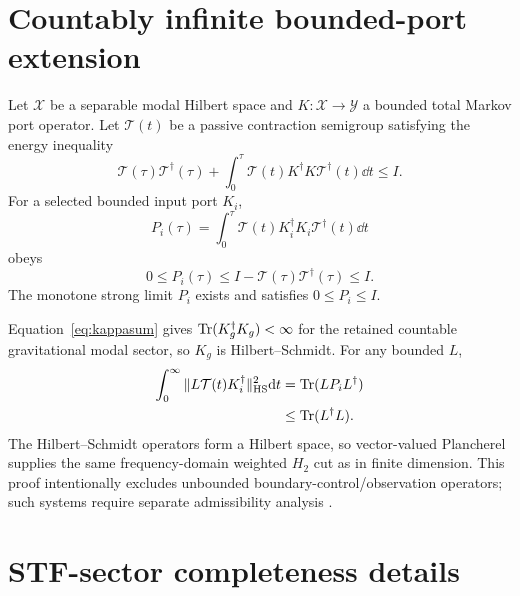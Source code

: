 \appendix

\section{Countably infinite bounded-port extension}
\label{app:infinite}

Let $\mathcal X$ be a separable modal Hilbert space and $K:\mathcal X\rightarrow\mathcal Y$ a bounded total Markov port operator. Let $\mathcal T(t)$ be a passive contraction semigroup satisfying the energy inequality
\begin{equation}
\mathcal T(\tau)\mathcal T^\dagger(\tau)
+\int_0^\tau
\mathcal T(t)K^\dagger K\mathcal T^\dagger(t)\dd t
\le I .
\end{equation}
For a selected bounded input port $K_i$,
\begin{equation}
P_i(\tau)=\int_0^\tau
\mathcal T(t)K_i^\dagger K_i\mathcal T^\dagger(t)\dd t
\end{equation}
obeys
\begin{equation}
0\le P_i(\tau)
\le I-\mathcal T(\tau)\mathcal T^\dagger(\tau)
\le I .
\end{equation}
The monotone strong limit $P_i$ exists and satisfies $0\le P_i\le I$.

Equation~\eqref{eq:kappasum} gives $\operatorname{Tr}(K_g^\dagger K_g)<\infty$ for the retained countable gravitational modal sector, so $K_g$ is Hilbert--Schmidt. For any bounded $L$,
\begin{align}
\int_0^\infty
\|L\mathcal T(t)K_i^\dagger\|_{\mathrm{HS}}^2\mathrm d t
&=\operatorname{Tr}(LP_iL^\dagger)\\
&\le\operatorname{Tr}(L^\dagger L).
\end{align}
The Hilbert--Schmidt operators form a Hilbert space, so vector-valued Plancherel supplies the same frequency-domain weighted $H_2$ cut as in finite dimension. This proof intentionally excludes unbounded boundary-control/observation operators; such systems require separate admissibility analysis \cite{BarasBrockett1975,Opmeer2013}.

\section{STF-sector completeness details}
\label{app:sectorresource}

